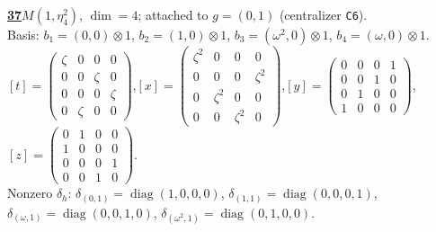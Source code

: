 \begin{samepage}\noindent\textbf{\underline{37}}\quad $M(1,\eta^{2}_{4})$, $\dim=4$; attached to $g=(0,1)$ (centralizer \texttt{C6}).\\
Basis: $b_{1}=(0,0)\otimes 1$, $b_{2}=(1,0)\otimes 1$, $b_{3}=(\omega^2,0)\otimes 1$, $b_{4}=(\omega,0)\otimes 1$.\\
$[t]=\left(\begin{smallmatrix} \zeta & 0 & 0 & 0 \\ 0 & 0 & \zeta & 0 \\ 0 & 0 & 0 & \zeta \\ 0 & \zeta & 0 & 0 \end{smallmatrix}\right)$,\quad $[x]=\left(\begin{smallmatrix} \zeta^2 & 0 & 0 & 0 \\ 0 & 0 & 0 & \zeta^2 \\ 0 & \zeta^2 & 0 & 0 \\ 0 & 0 & \zeta^2 & 0 \end{smallmatrix}\right)$,\quad $[y]=\left(\begin{smallmatrix} 0 & 0 & 0 & 1 \\ 0 & 0 & 1 & 0 \\ 0 & 1 & 0 & 0 \\ 1 & 0 & 0 & 0 \end{smallmatrix}\right)$,\quad $[z]=\left(\begin{smallmatrix} 0 & 1 & 0 & 0 \\ 1 & 0 & 0 & 0 \\ 0 & 0 & 0 & 1 \\ 0 & 0 & 1 & 0 \end{smallmatrix}\right)$.\\
Nonzero $\delta_h$: $\delta_{(0,1)}=\operatorname{diag}(1,0,0,0)$, $\delta_{(1,1)}=\operatorname{diag}(0,0,0,1)$, $\delta_{(\omega,1)}=\operatorname{diag}(0,0,1,0)$, $\delta_{(\omega^2,1)}=\operatorname{diag}(0,1,0,0)$.\end{samepage}
\medskip

